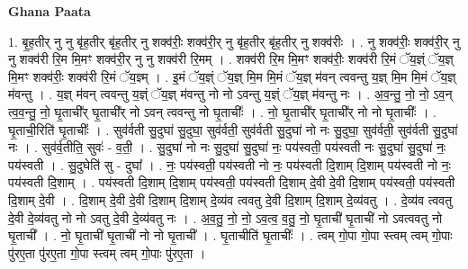 \documentclass[17pt]{extarticle}
\begin{document}
\textbf{Ghana Paata } \newline

1. बृ॒ह॒तीर् नु नु बृ॑ह॒तीर् बृ॑ह॒तीर् नु शक्व॑रीः॒ शक्व॑री॒र् नु बृ॑ह॒तीर् बृ॑ह॒तीर् नु शक्व॑रीः । . नु शक्व॑रीः॒ शक्व॑री॒र् नु नु शक्व॑री रि॒म मि॒मꣳ शक्व॑री॒र् नु नु शक्व॑री रि॒मम् । . शक्व॑री रि॒म मि॒मꣳ शक्व॑रीः॒ शक्व॑री रि॒मं ॅय॒ज्ञ्ं ॅय॒ज्ञ् मि॒मꣳ शक्व॑रीः॒ शक्व॑री रि॒मं ॅय॒ज्ञ्म् । . इ॒मं ॅय॒ज्ञ्ं ॅय॒ज्ञ् मि॒म मि॒मं ॅय॒ज्ञ् म॑वन् त्ववन्तु य॒ज्ञ् मि॒म मि॒मं ॅय॒ज्ञ् म॑वन्तु । . य॒ज्ञ् म॑वन् त्ववन्तु य॒ज्ञ्ं ॅय॒ज्ञ् म॑वन्तु नो नो ऽवन्तु य॒ज्ञ्ं ॅय॒ज्ञ् म॑वन्तु नः । . अ॒व॒न्तु॒ नो॒ नो॒ ऽव॒न् त्व॒व॒न्तु॒ नो॒ घृ॒ताची᳚र् घृ॒ताची᳚र् नो ऽवन् त्ववन्तु नो घृ॒ताचीः᳚ । . नो॒ घृ॒ताची᳚र् घृ॒ताची᳚र् नो नो घृ॒ताचीः᳚ । . घृ॒ताची॒रिति॑ घृ॒ताचीः᳚ । . सुव॑र्वती सु॒दुघा॑ सु॒दुघा॒ सुव॑र्वती॒ सुव॑र्वती सु॒दुघा॑ नो नः सु॒दुघा॒ सुव॑र्वती॒ सुव॑र्वती सु॒दुघा॑ नः । . सुव॑र्व॒तीति॒ सुवः॑ - व॒ती॒ । . सु॒दुघा॑ नो नः सु॒दुघा॑ सु॒दुघा॑ नः॒ पय॑स्वती॒ पय॑स्वती नः सु॒दुघा॑ सु॒दुघा॑ नः॒ पय॑स्वती । . सु॒दुघेति॑ सु - दुघा᳚ । . नः॒ पय॑स्वती॒ पय॑स्वती नो नः॒ पय॑स्वती दि॒शाम् दि॒शाम् पय॑स्वती नो नः॒ पय॑स्वती दि॒शाम् । . पय॑स्वती दि॒शाम् दि॒शाम् पय॑स्वती॒ पय॑स्वती दि॒शाम् दे॒वी दे॒वी दि॒शाम् पय॑स्वती॒ पय॑स्वती दि॒शाम् दे॒वी । . दि॒शाम् दे॒वी दे॒वी दि॒शाम् दि॒शाम् दे॒व्य॑व त्ववतु दे॒वी दि॒शाम् दि॒शाम् दे॒व्य॑वतु । . दे॒व्य॑व त्ववतु दे॒वी दे॒व्य॑वतु नो नो ऽवतु दे॒वी दे॒व्य॑वतु नः । . अ॒व॒तु॒ नो॒ नो॒ ऽव॒त्व॒ व॒तु॒ नो॒ घृ॒ताची॑ घृ॒ताची॑ नो ऽवत्ववतु नो घृ॒ताची᳚ । . नो॒ घृ॒ताची॑ घृ॒ताची॑ नो नो घृ॒ताची᳚ । . घृ॒ताचीति॑ घृ॒ताचीः᳚ । . त्वम् गो॒पा गो॒पा स्त्वम् त्वम् गो॒पाः पु॑र‌ए॒ता पु॑र‌ए॒ता गो॒पा स्त्वम् त्वम् गो॒पाः पु॑र‌ए॒ता । \newline
\end{document}
